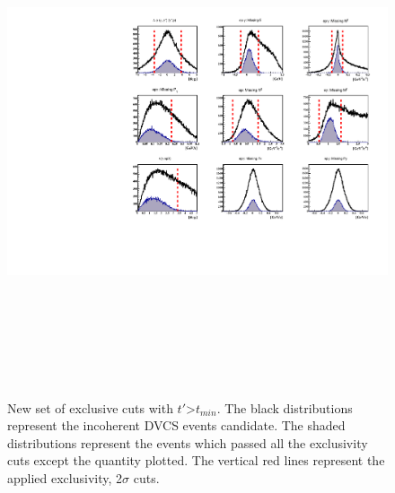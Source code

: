 \begin{figure}[h!]
   \includegraphics[height=15.0cm]{fig-incoh/all_incoh_exc_cuts_test.pdf}
   \caption{New set of exclusive cuts with $t'$>$t_{min}$. The black
      distributions represent the incoherent DVCS events candidate. The shaded
      distributions represent the events which passed all the exclusivity cuts
      except the quantity plotted. The vertical red lines represent the applied 
   exclusivity, 2$\sigma$ cuts.}
\label{fig:cuts_tprime}
\end{figure}

